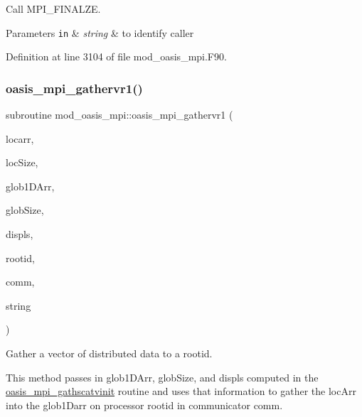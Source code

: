 Call M\+P\+I\+\_\+\+F\+I\+N\+A\+L\+ZE. 


\begin{DoxyParams}[1]{Parameters}
\mbox{\tt in}  & {\em string} & to identify caller \\
\hline
\end{DoxyParams}


Definition at line 3104 of file mod\+\_\+oasis\+\_\+mpi.\+F90.

\mbox{\label{namespacemod__oasis__mpi_a88a13ea3b4f96074669fdc872fe41728}} 
\subsubsection{\texorpdfstring{oasis\+\_\+mpi\+\_\+gathervr1()}{oasis\_mpi\_gathervr1()}}
{\footnotesize\ttfamily subroutine mod\+\_\+oasis\+\_\+mpi\+::oasis\+\_\+mpi\+\_\+gathervr1 (\begin{DoxyParamCaption}\item[{real(ip\+\_\+double\+\_\+p), dimension(\+:), intent(in)}]{locarr,  }\item[{integer(ip\+\_\+i4\+\_\+p), intent(in)}]{loc\+Size,  }\item[{real(ip\+\_\+double\+\_\+p), dimension(\+:), intent(inout)}]{glob1\+D\+Arr,  }\item[{integer(ip\+\_\+i4\+\_\+p), dimension(\+:), intent(in)}]{glob\+Size,  }\item[{integer(ip\+\_\+i4\+\_\+p), dimension(\+:), intent(in)}]{displs,  }\item[{integer(ip\+\_\+i4\+\_\+p), intent(in)}]{rootid,  }\item[{integer(ip\+\_\+i4\+\_\+p), intent(in)}]{comm,  }\item[{character($\ast$), intent(in), optional}]{string }\end{DoxyParamCaption})\hspace{0.3cm}{\ttfamily [private]}}



Gather a vector of distributed data to a rootid. 

This method passes in glob1\+D\+Arr, glob\+Size, and displs computed in the \hyperlink{interfacemod__oasis__mpi_1_1oasis__mpi__gathscatvinit}{oasis\+\_\+mpi\+\_\+gathscatvinit} routine and uses that information to gather the loc\+Arr into the glob1\+Darr on processor rootid in communicator comm.


